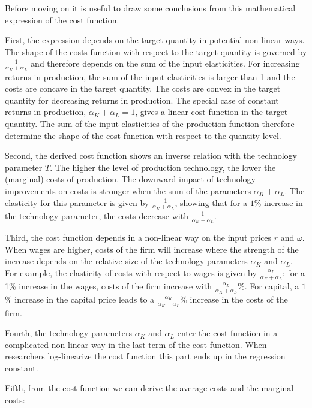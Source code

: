 \documentclass[
]{book}
\begin{document}
Before moving on it is useful to draw some conclusions from this mathematical expression of the cost function.

First, the expression depends on the target quantity in potential non-linear ways. The shape of the costs function with respect to the target quantity is governed by \(\frac{1}{\alpha_K+ \alpha_L}\) and therefore depends on the sum of the input elasticities. For increasing returns in production, the sum of the input elasticities is larger than 1 and the costs are concave in the target quantity. The costs are convex in the target quantity for decreasing returns in production. The special case of constant returns in production, \(\alpha_K+ \alpha_L = 1\), gives a linear cost function in the target quantity. The sum of the input elasticities of the production function therefore determine the shape of the cost function with respect to the quantity level.

Second, the derived cost function shows an inverse relation with the technology parameter \(T\). The higher the level of production technology, the lower the (marginal) costs of production. The downward impact of technology improvements on costs is stronger when the sum of the parameters \(\alpha_K+ \alpha_L\). The elasticity for this parameter is given by \(\frac{-1}{\alpha_K+ \alpha_L}\), showing that for a \(1\)\% increase in the technology parameter, the costs decrease with \(\frac{1}{\alpha_K+ \alpha_L}\).

Third, the cost function depends in a non-linear way on the input prices \(r\) and \(\omega\). When wages are higher, costs of the firm will increase where the strength of the increase depends on the relative size of the technology parameters \(\alpha_K\) and \(\alpha_L\). For example, the elasticity of costs with respect to wages is given by \(\frac{\alpha_L}{\alpha_K + \alpha_L}\): for a 1\% increase in the wages, costs of the firm increase with \(\frac{\alpha_L}{\alpha_K + \alpha_L}\)\%. For capital, a \(1\)\% increase in the capital price leads to a \(\frac{\alpha_K}{\alpha_K + \alpha_L}\)\% increase in the costs of the firm.

Fourth, the technology parameters \(\alpha_K\) and \(\alpha_L\) enter the cost function in a complicated non-linear way in the last term of the cost function. When researchers log-linearize the cost function this part ends up in the regression constant.

Fifth, from the cost function we can derive the average costs and the marginal costs:
\end{document}

